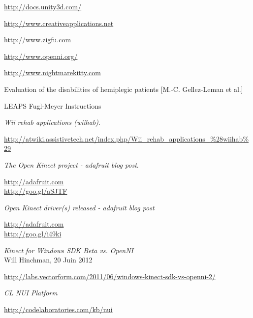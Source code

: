 \begin{thebibliography}{9}

  \url{http://docs.unity3d.com/}

  \url{http://www.creativeapplications.net}
  
  \url{http://www.zigfu.com}

  \url{http://www.openni.org/}

  \url{http://www.nightmarekitty.com }

  Evaluation of the disabilities of hemiplegic patients [M.-C. Gellez-Leman et al.]
  
  LEAPS Fugl-Meyer Instructions

  \emph{Wii rehab applications (wiihab)}.\\
  \begin{small}
  \url{http://atwiki.assistivetech.net/index.php/Wii_rehab_applications_\%28wiihab\%29}
  \end{small}
  
  \emph{The Open Kinect project - adafruit blog post}. \\
  \begin{small}
  \url{http://adafruit.com}\\
  \url{http://goo.gl/aSJTF}
  \end{small}

  \emph{Open Kinect driver(s) released - adafruit blog post}\\
  \begin{small}
  \url{http://adafruit.com}\\
  \url{http://goo.gl/i49ki}
  \end{small}

  \emph{Kinect for Windows SDK Beta vs. OpenNI}\\
  Will Hinchman, 20 Juin 2012\\
  \begin{small}
  \url{http://labs.vectorform.com/2011/06/windows-kinect-sdk-vs-openni-2/}
  \end{small}
  
  \emph{CL NUI Platform}\\
  \begin{small}
  \url{http://codelaboratories.com/kb/nui}
  \end{small}
  

\end{thebibliography}
